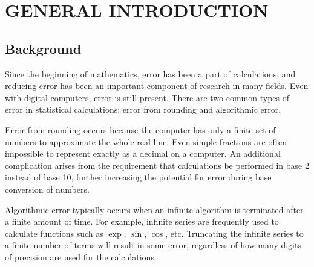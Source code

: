 
\chapter{GENERAL INTRODUCTION}

\section{Background}

Since the beginning of mathematics, error has been a part of calculations, and
reducing error has been an important component of research in many fields.
Even with digital computers, error is still present.  There are
two common types of error in statistical calculations: error from rounding and
algorithmic error.

Error from rounding occurs because the computer has only a finite set of
numbers to approximate the whole real line.  Even simple fractions are often 
impossible to represent exactly as a decimal on a computer.  An additional
complication arises from the requirement that calculations be performed in
base 2 instead of base 10, further increasing the potential for error during
base conversion of numbers. 
 
Algorithmic error typically occurs when an infinite algorithm is terminated
after a finite amount of time.  For example, infinite series are frequently
used to calculate functions such as $\exp$, $\sin$, $\cos$, etc.
Truncating the infinite series to a finite number of terms will result in some
error, regardless of how many digits of precision are used for the
calculations. 

